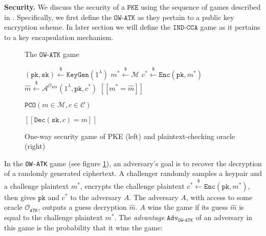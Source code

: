 \documentclass[journal=tches,submission]{iacrtrans}
\newcommand{\pke}{\texttt{PKE}}
\newcommand{\keygen}{\texttt{KeyGen}}
\newcommand{\encrypt}{\texttt{Enc}}
\newcommand{\decrypt}{\texttt{Dec}}
\newcommand{\pk}{\texttt{pk}}
\newcommand{\sk}{\texttt{sk}}
\newcommand{\pco}{\texttt{PCO}}
\newcommand{\leftsample}{\stackrel{\$}{\leftarrow}}
\newcommand{\llbrack}{[\![}
\newcommand{\rrbrack}{]\!]}
\newcommand{\adv}{\texttt{Adv}}
\begin{document}
\textbf{Security.} We discuss the security of a $\pke$ using the sequence of games described in \cite{shoup2004sequences}. Specifically, we first define the $\texttt{OW-ATK}$ as they pertain to a public key encryption scheme. In later section we will define the $\texttt{IND-CCA}$ game as it pertains to a key encapsulation mechanism.

\def\algowatkgame{
    \begin{algorithm}[H]
        \caption*{The $\texttt{OW-ATK}$ game}
        \begin{algorithmic}[1]
            \State $(\pk, \sk) \leftsample \keygen(1^\lambda)$
            \State $m^\ast \leftsample \mathcal{M}$
            \State $c^\ast \leftsample \encrypt(\pk, m^\ast)$
            \State $\hat{m} \leftsample \mathcal{A}^{\mathcal{O}_\texttt{ATK}}(
                1^\lambda, \pk, c^\ast
            )$
            \State \Return $\llbrack m^\ast = \hat{m} \rrbrack$
        \end{algorithmic}
    \end{algorithm}
}
\def\algpco{
    \begin{algorithm}[H]
        \caption*{$\pco(m \in \mathcal{M}, c \in \mathcal{C})$}
        \begin{algorithmic}[1]
            \State \Return $\llbrack \decrypt(\sk, c) = m \rrbrack$
        \end{algorithmic}
    \end{algorithm}
}
\begin{figure}[H]
    \centering
    \begin{minipage}[b]{0.49\textwidth}
        \algowatkgame
    \end{minipage}
    \begin{minipage}[b]{0.49\textwidth}
        \algpco
    \end{minipage}
    \caption{
        One-way security game of PKE (left) and plaintext-checking oracle (right)
    }\label{fig:ow-game-pco}
\end{figure}

In the \texttt{OW-ATK} game (see figure \ref{fig:ow-game-pco}), an adversary's goal is to recover the decryption of a randomly generated ciphertext. A challenger randomly samples a keypair and a challenge plaintext $m^\ast$, encrypts the challenge plaintext $c^\ast \leftsample \encrypt(\pk, m^\ast)$, then gives $\pk$ and $c^\ast$ to the adversary $A$. The adversary $A$, with access to some oracle $\mathcal{O}_\texttt{ATK}$, outputs a guess decryption $\hat{m}$. $A$ wins the game if its guess $\hat{m}$ is equal to the challenge plaintext $m^\ast$. The \textit{advantage} $\adv_\texttt{OW-ATK}$ of an adversary in this game is the probability that it wins the game:
\end{document}
